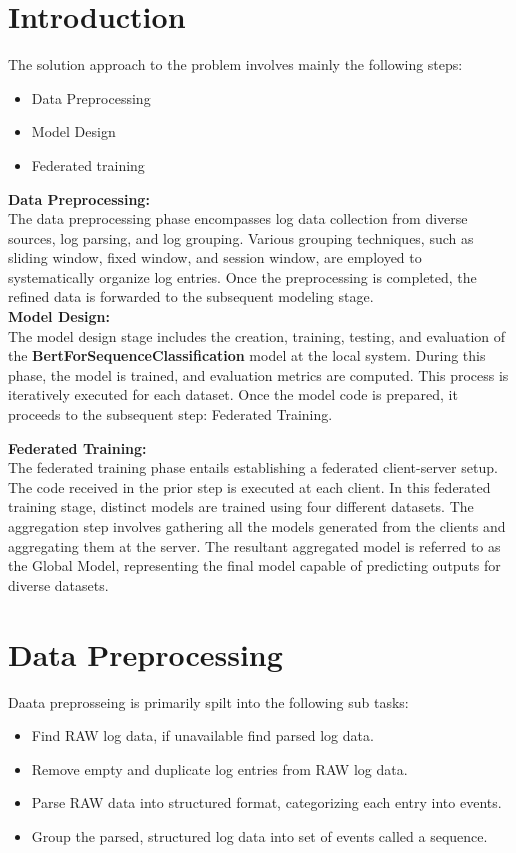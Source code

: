\documentclass[titlepage]{article}
\begin{document}
\section{Introduction}
The solution approach to the problem involves mainly the following steps:
\begin{itemize}
    \item Data Preprocessing
    \item Model Design
    \item Federated training 
\end{itemize}
\textbf{Data Preprocessing:} \\
The data preprocessing phase encompasses log data collection from diverse sources, log parsing, and log grouping. Various grouping techniques, such as sliding window, fixed window, and session window, are employed to systematically organize log entries. Once the preprocessing is completed, the refined data is forwarded to the subsequent modeling stage. \\

\textbf{Model Design:} \\
The model design stage includes the creation, training, testing, and evaluation of the \textbf{BertForSequenceClassification} model at the local system. During this phase, the model is trained, and evaluation metrics are computed. This process is iteratively executed for each dataset. Once the model code is prepared, it proceeds to the subsequent step: Federated Training. \

\textbf{Federated Training:} \\
The federated training phase entails establishing a federated client-server setup. The code received in the prior step is executed at each client. In this federated training stage, distinct models are trained using four different datasets. The aggregation step involves gathering all the models generated from the clients and aggregating them at the server. The resultant aggregated model is referred to as the Global Model, representing the final model capable of predicting outputs for diverse datasets.


\section{Data Preprocessing}
Daata preprosseing is primarily spilt into the following sub tasks: \\
\begin{itemize}
\item Find RAW log data, if unavailable find parsed log data.
\item Remove empty and duplicate log entries from RAW log data.
\item Parse RAW data into structured format, categorizing each entry into events.
\item Group the parsed, structured log data into set of events called a sequence.
\end{itemize}
\end{document}
